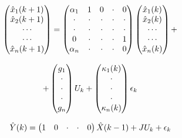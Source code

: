 \documentclass[journal]{IEEEtran}
\begin{document}
\begin{equation} \label{Kalman_Filter1}
\begin{tabular}{c}
$\begin{pmatrix}
\hat{x}_1(k+1) \\
\hat{x}_2(k+1)\\
\cdots \\
\cdots \\
\hat{x}_n(k+1)
\end{pmatrix}=
\begin{pmatrix}
\alpha_1 & 1 & 0 & \cdot & 0 \\
\cdot & \cdot & \cdot & \cdot & \cdot \\
\cdot & \cdot & \cdot & \cdot & \cdot \\
0 & \cdot & \cdot & \cdot & 1 \\
\alpha_n & \cdot & \cdot & \cdot & 0
\end{pmatrix}
\begin{pmatrix}
\hat{x}_1(k) \\
\hat{x}_2(k)\\
\cdots \\
\cdots \\
\hat{x}_n(k)
\end{pmatrix}+$\\
$$\\
$+\begin{pmatrix}
g_1 \\
\cdot \\
\cdot \\
\cdot \\
g_n
\end{pmatrix}{U_k}+
\begin{pmatrix}
\kappa_1(k) \\
\cdot \\
\cdot \\
\cdot \\
\kappa_n(k)
\end{pmatrix}
\epsilon_k
$
\end{tabular}
\end{equation}

\begin{equation} \label{Kalman_Filter2}
\begin{tabular}{c}
$\hat{Y}(k)=
\begin{pmatrix}
1 & 0 & \cdot & \cdot & 0
\end{pmatrix}
\hat{X}(k-1)+J{U_k}+{\epsilon_k}$
\end{tabular}
\end{equation}
\end{document}
